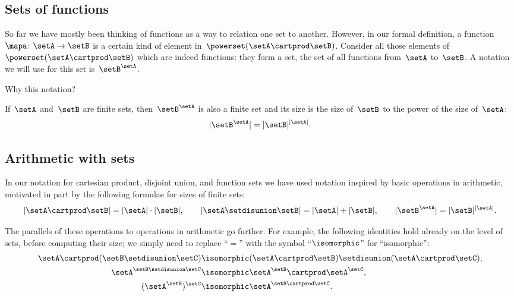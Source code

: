 
\subsection{Sets of functions}

So far we have mostly been thinking of functions as a way to relation one set to another.
However, in our formal definition, a function~$\mapa \colon \setA \to \setB$ is a certain kind of element in~$\powerset (\setA \cartprod \setB)$.
Consider all those elements of~$\powerset (\setA \cartprod \setB)$ which are indeed functions: they form a set, the set of all functions from~$\setA$ to~$\setB$.
A notation we will use for this set is~$\setB^{\setA}$.

Why this notation?

If~$\setA$ and~$\setB$ are finite sets, then~$\setB^{\setA}$ is also a finite set and its size is the size of~$\setB$ to the power of the size of~$\setA$:
\begin{equation*}
    \vert \setB^{\setA} \vert = \vert \setB \vert^{\vert \setA \vert}.
\end{equation*}

\subsection{Arithmetic with sets}

In our notation for cartesian product, disjoint union, and function sets we have used notation inspired by basic operations in arithmetic, motivated in part by the following formulae for sizes of finite sets:
\begin{equation*}
    \vert \setA \cartprod \setB \vert = \vert \setA \vert \cdot \vert \setB \vert, \qquad \vert \setA \setdisunion \setB \vert = \vert \setA \vert + \vert \setB \vert, \qquad \vert \setB^{\setA} \vert = \vert \setB \vert^{\vert \setA \vert}.
\end{equation*}

The parallels of these operations to operations in arithmetic go further.
For example, the following identities hold already on the level of sets, before computing their size; we simply need to replace ``$=$'' with the symbol ``$\isomorphic$'' for ``isomorphic'':
\begin{align*}
    \setA \cartprod (\setB \setdisunion \setC) & \isomorphic (\setA \cartprod \setB) \setdisunion (\setA \cartprod \setC), \\
    \setA^{\setB \setdisunion \setC}           & \isomorphic \setA^\setB \cartprod \setA^\setC, \\
    (\setA^\setB)^\setC                        & \isomorphic \setA^{\setB \cartprod \setC}.
\end{align*}

